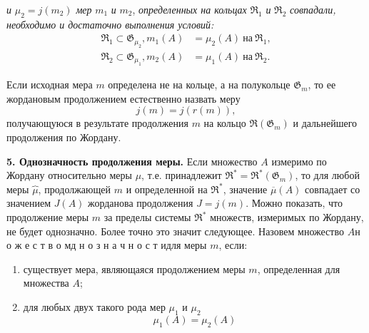 \documentclass[oneside]{book}
\begin{document}
    \emph{и} $\mu_2 = j(m_2)$ \emph{мер} $m_1$ \emph{и} $m_2$, \emph{определенных на кольцах} $\mathfrak{R}_1$ \emph{и} $\mathfrak{R}_2$
    \emph{совпадали, необходимо и достаточно выполнения условий:}
    \begin{align*}
        \mathfrak{R}_1 \subset \mathfrak{G}_{\mu_2}, m_1(A) &= \mu_2(A) ~на~ \mathfrak{R}_1,\\
        \mathfrak{R}_2 \subset \mathfrak{G}_{\mu_1}, m_2(A) &= \mu_1(A) ~на~ \mathfrak{R}_2.
    \end{align*}
    \par Если исходная мера $m$ определена не на кольце, а на полукольце $\mathfrak{G}_m$, то ее жордановым продолжением естественно назвать меру
    $$j(m) = j(r(m)),$$
    получающуюся в результате продолжения $m$ на кольцо $\mathfrak{R}(\mathfrak{G}_m)$ и дальнейшего продолжения по Жордану.
    \par\textbf{5. Однозначность продолжения меры.} Если множество $A$ измеримо по Жордану относительно меры $\mu$, т.е. принадлежит
    $\mathfrak{R}^\ast = \mathfrak{R}^\ast(\mathfrak{G}_m)$, то для любой меры $\overbrace{\mu}$, продолжающей $m$ и определенной на 
    $\mathfrak{R}^\ast$, значение $\overline{\mu}(A)$ совпадает со значением $J(A)$ жорданова продолжения $J=j(m)$. 
    Можно показать, что продолжение меры $m$ за пределы системы $\mathfrak{R}^\ast$ множеств, измеримых по Жордану, не будет однозначно.
    Более точно это значит следующее. Назовем множество $A$\space{} н о ж е с т в о м\space{} д н о з н а ч н о с т и\space\space для меры $m$,
    если:
    \begin{enumerate}
        \item существует мера, являющаяся продолжением меры $m$, определенная для множества $A$;
        \newpage
        \thispagestyle{sec}
        \item для любых двух такого рода мер $\mu_1$ и $\mu_2$ $$ \mu_1(A) = \mu_2(A) $$
    \end{enumerate}
\end{document}
